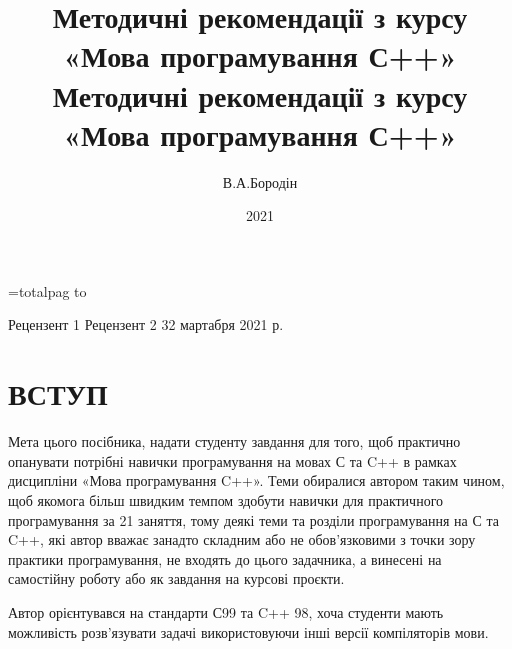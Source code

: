 \documentclass[a5paper,titlepage,openany,twoside,
]
{book_unv}%
\date{}
\begin{document}
\titlepage
\author{В.А.Бородін}
\title{Методичні рекомендації з курсу «Мова програмування С++» }
\date{2021}
\maketitle


=totalpag
 to \totalpag
{}
\title{Методичні рекомендації з курсу «Мова програмування С++» }%
\secondpage%
{\totalpag}
{Рецензент 1}%
{Рецензент 2}%
{32 мартабря 2021 р.}%
\setcounter{page}{2}
\tableofcontents


\chapter*{ ВСТУП }
Мета цього посібника, надати студенту завдання для того, щоб практично
опанувати потрібні навички програмування на мовах С та C++ в рамках
дисципліни «Мова програмування C++». Теми обиралися автором таким чином,
щоб  якомога більш швидким темпом здобути навички для практичного
програмування за 21 заняття, тому деякі теми та розділи програмування на
С та C++, які автор вважає занадто складним або не обов'язковими з точки
зору практики програмування, не входять до цього задачника, а винесені
на самостійну роботу або як завдання на курсові проєкти.

Автор орієнтувався на стандарти С99 та C++ 98, хоча студенти мають можливість
розв'язувати задачі використовуючи інші версії компіляторів мови.
\end{document}
